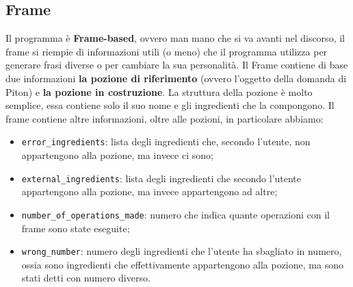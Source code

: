 \subsection{Frame}
Il programma è \textbf{Frame-based}, ovvero man mano che si va avanti nel discorso, il frame si riempie di informazioni utili (o meno) che il programma utilizza per generare frasi diverse o per cambiare la sua personalità. Il Frame contiene di base due informazioni \textbf{la pozione di riferimento} (ovvero l'oggetto della domanda di Piton) e \textbf{la pozione in costruzione}.
La struttura della pozione è molto semplice, essa contiene solo il suo nome e gli ingredienti che la compongono. Il frame contiene altre informazioni, oltre alle pozioni, in particolare abbiamo:
\begin{itemize}
    \item \texttt{error\_ingredients}: lista degli ingredienti che, secondo l'utente, non appartengono alla pozione, ma invece ci sono;
    \item \texttt{external\_ingredients}: lista degli ingredienti che secondo l'utente appartengono alla pozione, ma invece appartengono ad altre;
    \item \texttt{number\_of\_operations\_made}: numero che indica quante operazioni con il frame sono state eseguite;
    \item \texttt{wrong\_number}: numero degli ingredienti che l'utente ha sbagliato in numero, ossia sono ingredienti che effettivamente appartengono alla pozione, ma sono stati detti con numero diverso.
\end{itemize}